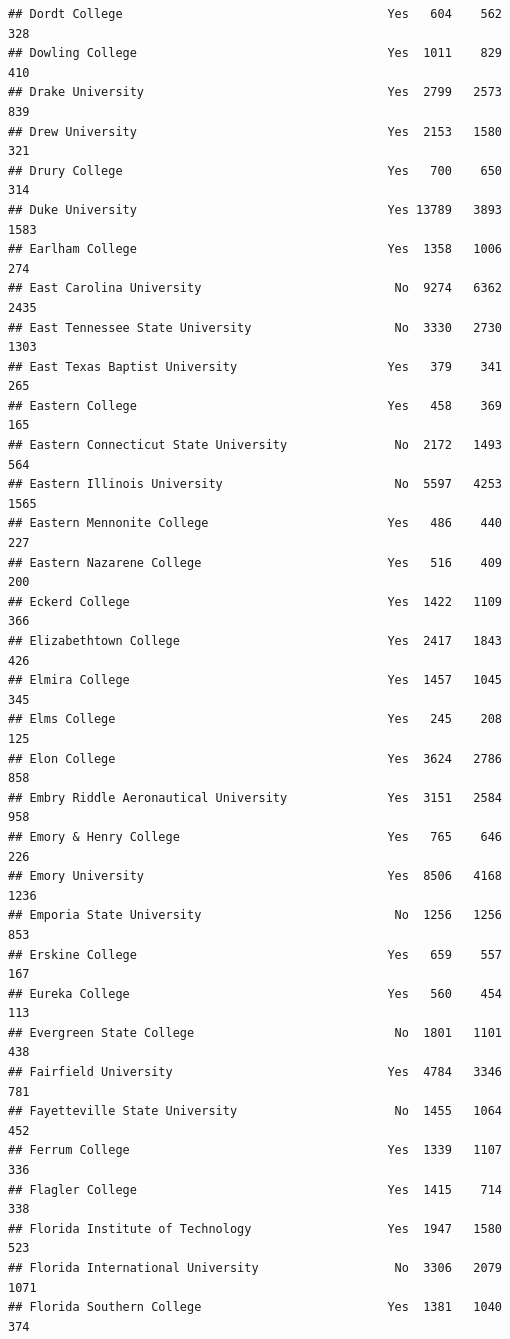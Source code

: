 \documentclass[
]{article}
\begin{document}
\begin{verbatim}
## Dordt College                                     Yes   604    562    328
## Dowling College                                   Yes  1011    829    410
## Drake University                                  Yes  2799   2573    839
## Drew University                                   Yes  2153   1580    321
## Drury College                                     Yes   700    650    314
## Duke University                                   Yes 13789   3893   1583
## Earlham College                                   Yes  1358   1006    274
## East Carolina University                           No  9274   6362   2435
## East Tennessee State University                    No  3330   2730   1303
## East Texas Baptist University                     Yes   379    341    265
## Eastern College                                   Yes   458    369    165
## Eastern Connecticut State University               No  2172   1493    564
## Eastern Illinois University                        No  5597   4253   1565
## Eastern Mennonite College                         Yes   486    440    227
## Eastern Nazarene College                          Yes   516    409    200
## Eckerd College                                    Yes  1422   1109    366
## Elizabethtown College                             Yes  2417   1843    426
## Elmira College                                    Yes  1457   1045    345
## Elms College                                      Yes   245    208    125
## Elon College                                      Yes  3624   2786    858
## Embry Riddle Aeronautical University              Yes  3151   2584    958
## Emory & Henry College                             Yes   765    646    226
## Emory University                                  Yes  8506   4168   1236
## Emporia State University                           No  1256   1256    853
## Erskine College                                   Yes   659    557    167
## Eureka College                                    Yes   560    454    113
## Evergreen State College                            No  1801   1101    438
## Fairfield University                              Yes  4784   3346    781
## Fayetteville State University                      No  1455   1064    452
## Ferrum College                                    Yes  1339   1107    336
## Flagler College                                   Yes  1415    714    338
## Florida Institute of Technology                   Yes  1947   1580    523
## Florida International University                   No  3306   2079   1071
## Florida Southern College                          Yes  1381   1040    374

\end{verbatim}
\end{document}
